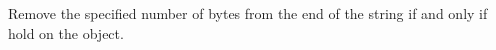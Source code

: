 Remove the specified number of bytes from the end of the string if and only if
 hold on the object.



